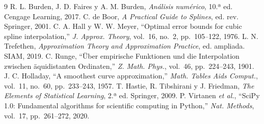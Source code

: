 \documentclass[conference,a4paper]{IEEEtran}
\begin{document}
\begin{thebibliography}{9}
 R. L. Burden, J. D. Faires y A. M. Burden, \emph{Análisis numérico}, 10.ª ed.
Cengage Learning, 2017.
 C. de Boor, \emph{A Practical Guide to Splines}, ed. rev.
Springer, 2001.
 C. A. Hall y W. W. Meyer, ``Optimal error bounds for cubic spline interpolation,''
\emph{J. Approx. Theory}, vol.~16, no.~2, pp.~105--122, 1976.
 L. N. Trefethen, \emph{Approximation Theory and Approximation Practice}, ed.
ampliada. SIAM, 2019.
 C. Runge, ``Über empirische Funktionen und die Interpolation zwischen äquidistanten
Ordinaten,'' \emph{Z. Math. Phys.}, vol.~46, pp.~224--243, 1901.
 J. C. Holladay, ``A smoothest curve approximation,'' \emph{Math. Tables Aids
Comput.}, vol.~11, no.~60, pp.~233--243, 1957.
 T. Hastie, R. Tibshirani y J. Friedman, \emph{The Elements of Statistical Learning},
2.ª ed. Springer, 2009.
 P. Virtanen \emph{et al.}, ``SciPy 1.0: Fundamental algorithms for scientific
computing in Python,'' \emph{Nat. Methods}, vol.~17, pp.~261--272, 2020.
\end{thebibliography}
\end{document}
